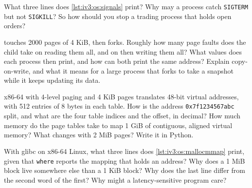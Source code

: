 \begin{question}\label{iq:iv3:operating-systems-concurrency-and-networks:8}
What three lines does \cref{lst:iv3:os:signals} print? Why may a process catch \texttt{SIGTERM} but not \texttt{SIGKILL}? So how should you stop a trading process that holds open orders?
\label{lst:iv3:os:signals}
\end{question}

\begin{question}\label{iq:iv3:operating-systems-concurrency-and-networks:9}
 touches 2000 pages of 4 KiB, then forks. Roughly how many page faults does the child take on reading them all, and on then writing them all? What values does each process then print, and how can both print the same address? Explain copy-on-write, and what it means for a large process that forks to take a snapshot while it keeps updating its data.
\label{lst:iv3:os:cow}
\end{question}

\begin{question}\label{iq:iv3:operating-systems-concurrency-and-networks:10}
x86-64 with 4-level paging and 4 KiB pages translates 48-bit virtual addresses, with 512 entries of 8 bytes in each table. How is the address \texttt{0x7f1234567abc} split, and what are the four table indices and the offset, in decimal? How much memory do the page tables take to map 1 GiB of contiguous, aligned virtual memory? What changes with 2 MiB pages? Write it in Python.
\end{question}

\begin{question}\label{iq:iv3:operating-systems-concurrency-and-networks:11}
With glibc on x86-64 Linux, what three lines does \cref{lst:iv3:os:mallocmmap} print, given that \texttt{where} reports the mapping that holds an address? Why does a 1 MiB block live somewhere else than a 1 KiB block? Why does the last line differ from the second word of the first? Why might a latency-sensitive program care?
\label{lst:iv3:os:mallocmmap}
\end{question}


